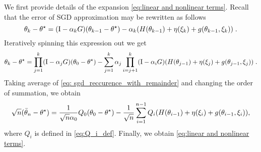 We first provide details of the expansion \eqref{eq:linear and nonlinear terms}. Recall that the error of SGD approximation may be rewritten as follows
\begin{equation}
    \label{eq: sgd_reccurence_with_remainder}
    \theta_k-\theta^\star = (\mathrm{I} - \alpha_k G) (\theta_{k-1}-\theta^\star) - \alpha_k ( H(\theta_{k-1}) + \eta(\xi_k) + g(\theta_{k-1}, \xi_k))\;.
\end{equation}
Iteratively spinning this expression out we get
\begin{equation}
    \label{eq: sgd_reccurence_with_remainder_2}
    \theta_k-\theta^\star = \prod_{j=1}^k(\mathrm{I} - \alpha_j G) (\theta_{0}-\theta^\star) - \sum_{j=1}^k \alpha_j \prod_{i = j+1}^k (\mathrm{I} - \alpha_i G) ( H(\theta_{j-1}) + \eta(\xi_j) + g(\theta_{j-1}, \xi_j))\;.
\end{equation}
Taking average of \eqref{eq: sgd_reccurence_with_remainder} and changing the order of summation, we obtain 
\begin{equation}
    \sqrt{n}(\bar\theta_n -\theta^\star) = \frac{1}{\sqrt{n}\alpha_0}Q_0(\theta_0-\theta^\star) -\frac{1}{\sqrt{n}}\sum_{i=1}^{n-1}Q_i(H(\theta_{i-1}) + \eta(\xi_i) + g(\theta_{i-1}, \xi_i)),
\end{equation}
where $Q_i$ is defined in \eqref{eq:Q_i_def}. Finally, we obtain \eqref{eq:linear and nonlinear terms}. 

